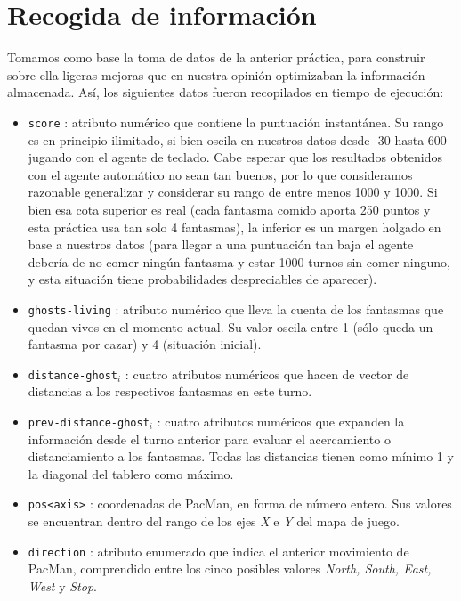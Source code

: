 \documentclass[12pt]{article}
\begin{document}
\newpage
\section{Recogida de información}


Tomamos como base la toma de datos de la anterior práctica, para construir sobre ella ligeras mejoras que en nuestra opinión optimizaban la información almacenada. Así, los siguientes datos fueron recopilados en tiempo de ejecución:

\begin{itemize}
    \item \texttt{score} : atributo numérico que contiene la puntuación instantánea. Su rango es en principio ilimitado, si bien oscila en nuestros datos desde -30 hasta 600 jugando con el agente de teclado. Cabe esperar que los resultados obtenidos con el agente automático no sean tan buenos, por lo que consideramos razonable generalizar y considerar su rango de entre menos 1000 y 1000. Si bien esa cota superior es real (cada fantasma comido aporta 250 puntos y esta práctica usa tan solo 4 fantasmas), la inferior es un margen holgado en base a nuestros datos (para llegar a una puntuación tan baja el agente debería de no comer ningún fantasma y estar 1000 turnos sin comer ninguno, y esta situación tiene probabilidades despreciables de aparecer).
    \item \texttt{ghosts-living} : atributo numérico que lleva la cuenta de los fantasmas que quedan vivos en el momento actual. Su valor oscila entre 1 (sólo queda un fantasma por cazar) y 4 (situación inicial).
    \item \texttt{distance-ghost}$_{i}$ : cuatro atributos numéricos que hacen de vector de distancias a los respectivos fantasmas en este turno.
    \item \texttt{prev-distance-ghost}$_{i}$ : cuatro atributos numéricos que expanden la información desde el turno anterior para evaluar el acercamiento o distanciamiento a los fantasmas. Todas las distancias tienen como mínimo 1 y la diagonal del tablero como máximo.
    \item \texttt{pos\textless axis\textgreater} : coordenadas de PacMan, en forma de número entero. Sus valores se encuentran dentro del rango de los ejes \textit{X} e \textit{Y} del mapa de juego.
    \item \texttt{direction} : atributo enumerado que indica el anterior movimiento de PacMan, comprendido entre los cinco posibles valores \textit{North, South, East, West} y \textit {Stop}.

\end{itemize}
\end{document}
